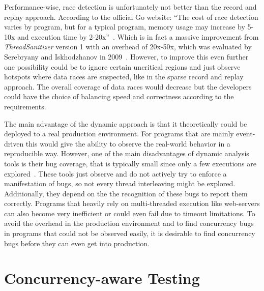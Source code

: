 \documentclass[english]{lni}
\begin{document}
Performance-wise, race detection is unfortunately not better than the record and replay approach.
According to the official Go website: ``The cost of race detection varies by program, but for a typical program, memory usage may increase by 5-10x and execution time by 2-20x''~\cite{goRaceDetector}.
Which is in fact a massive improvement from \emph{ThreadSanitizer} version 1 with an overhead of 20x-50x, which was evaluated by Serebryany and Iskhodzhanov in 2009~\cite{serebry2009threadsanitizer}.
However, to improve this even further one possibility could be to ignore certain uncritical regions and just observe hotspots where data races are suspected, like in the sparse record and replay approach.
The overall coverage of data races would decrease but the developers could have the choice of balancing speed and correctness according to the requirements.

The main advantage of the dynamic approach is that it theoretically could be deployed to a real production environment.
For programs that are mainly event-driven this would give the ability to observe the real-world behavior in a reproducible way.
However, one of the main disadvantages of dynamic analysis tools is their bug coverage, that is typically small since only a few executions are explored~\cite{qadeer2004kiss}.
These tools just observe and do not actively try to enforce a manifestation of bugs, so not every thread interleaving might be explored.
Additionally, they depend on the the recognition of these bugs to report them correctly.
Programs that heavily rely on multi-threaded execution like web-servers can also become very inefficient or could even fail due to timeout limitations.
To avoid the overhead in the production environment and to find concurrency bugs in programs that could not be observed easily, it is desirable to find concurrency bugs before they can even get into production.


\section{Concurrency-aware Testing}
\label{sct:testing}
\end{document}
